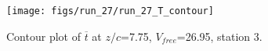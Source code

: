 \begin{figure}[H]
\centering
\texttt{[image: figs/run\_27/run\_27\_T\_contour]}
\caption{Contour plot of $\overline{t}$ at $z/c$=7.75, $V_{free}$=26.95, station 3.}
\label{fig:run_27_T_contour}
\end{figure}



